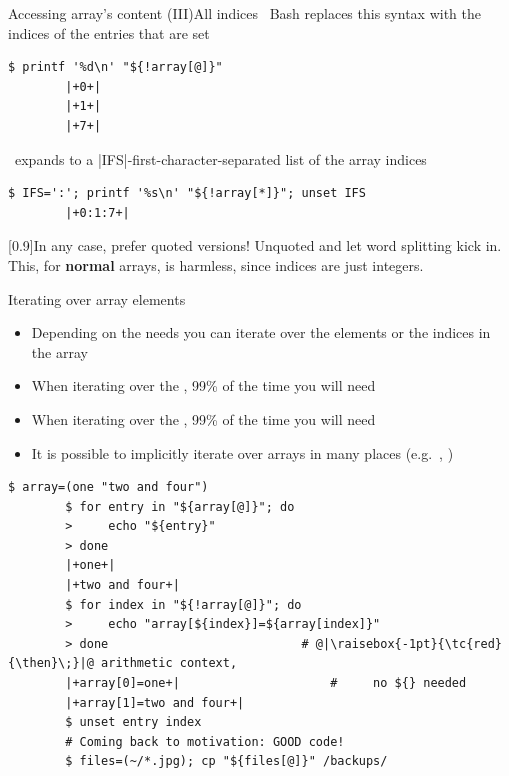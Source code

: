 \begin{frame}[fragile]{Accessing array's content (III)}{All indices}
    \vspace{-1mm}\centering
    \, Bash replaces this syntax with the indices of the entries that are set
    \smallskip
    \begin{lstlisting}[style=MyBash, numbers=none]
        $ printf '%d\n' "${!array[@]}"
        |+0+|
        |+1+|
        |+7+|
    \end{lstlisting}
    \medskip
    \, expands to a \bash|IFS|-first-character-separated list of the array indices
    \smallskip
    \begin{lstlisting}[style=MyBash, numbers=none]
        $ IFS=':'; printf '%s\n' "${!array[*]}"; unset IFS
        |+0:1:7+|
    \end{lstlisting}
    \medskip
    \begin{varblock}{}[0.9\textwidth]{In any case, prefer quoted versions!}
        Unquoted  and  let \alert{word splitting} kick in.
        This, for \textbf{normal} arrays, is harmless, since indices are just integers.
    \end{varblock}
\end{frame}
\begin{frame}[fragile]{Iterating over array elements}
    \vspace{-3mm}
    \begin{itemize}
        \item Depending on the needs you can iterate over the elements or the indices in the array
        \item When iterating over the \textbf{}, 99\% of the time you will need \,
        \item When iterating over the \textbf{}, 99\% of the time you will need \,
        \item It is possible to implicitly iterate over arrays in many places (e.g.\ , )
    \end{itemize}
    \begin{lstlisting}[style=MyBash]
        $ array=(one "two and four")
        $ for entry in "${array[@]}"; do
        >     echo "${entry}"
        > done
        |+one+|
        |+two and four+|
        $ for index in "${!array[@]}"; do
        >     echo "array[${index}]=${array[index]}"
        > done                           # @|\raisebox{-1pt}{\tc{red}{\then}\;}|@ arithmetic context,
        |+array[0]=one+|                     #     no ${} needed
        |+array[1]=two and four+|
        $ unset entry index
        # Coming back to motivation: GOOD code!
        $ files=(~/*.jpg); cp "${files[@]}" /backups/
    \end{lstlisting}
\end{frame}
